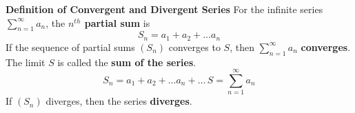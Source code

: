 \nopagenumbers
{\bf Definition of Convergent and Divergent Series}
\vskip 6pt
For the infinite series $\sum_{n=1}^{\infty} a_n$, the {\bf $n^{th}$ partial sum} is $$S_n=a_1+a_2+ \ldots a_n$$ If the sequence of partial sums $(S_n)$ converges to $S$, then $\sum_{n=1}^\infty a_n$ {\bf converges}. The limit $S$ is called the {\bf sum of the series}. $$S_n=a_1+a_2+ \ldots a_n+ \ldots \, S=\sum_{n=1}^\infty a_n$$ If $(S_n)$ diverges, then the series {\bf diverges}.

\vfill\eject
